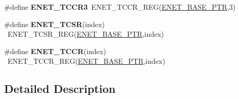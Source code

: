 \begin{DoxyCompactItemize}
\item 
\hypertarget{group___e_n_e_t___register___accessor___macros_ga71425ef7a21238436f0595fccd58d3b8}{}\#define {\bfseries E\+N\+E\+T\+\_\+\+T\+C\+C\+R3}~E\+N\+E\+T\+\_\+\+T\+C\+C\+R\+\_\+\+R\+E\+G(\hyperlink{group___e_n_e_t___peripheral_gab64a2d991cc2bd76dd55ee25a52dcb5c}{E\+N\+E\+T\+\_\+\+B\+A\+S\+E\+\_\+\+P\+T\+R},3)\label{group___e_n_e_t___register___accessor___macros_ga71425ef7a21238436f0595fccd58d3b8}

\item 
\hypertarget{group___e_n_e_t___register___accessor___macros_gac84243e82edd91a55766d2305c24369b}{}\#define {\bfseries E\+N\+E\+T\+\_\+\+T\+C\+S\+R}(index)                                              ~E\+N\+E\+T\+\_\+\+T\+C\+S\+R\+\_\+\+R\+E\+G(\hyperlink{group___e_n_e_t___peripheral_gab64a2d991cc2bd76dd55ee25a52dcb5c}{E\+N\+E\+T\+\_\+\+B\+A\+S\+E\+\_\+\+P\+T\+R},index)\label{group___e_n_e_t___register___accessor___macros_gac84243e82edd91a55766d2305c24369b}

\item 
\hypertarget{group___e_n_e_t___register___accessor___macros_ga8a02b12095976e6d53d8a9bf87353202}{}\#define {\bfseries E\+N\+E\+T\+\_\+\+T\+C\+C\+R}(index)                                              ~E\+N\+E\+T\+\_\+\+T\+C\+C\+R\+\_\+\+R\+E\+G(\hyperlink{group___e_n_e_t___peripheral_gab64a2d991cc2bd76dd55ee25a52dcb5c}{E\+N\+E\+T\+\_\+\+B\+A\+S\+E\+\_\+\+P\+T\+R},index)\label{group___e_n_e_t___register___accessor___macros_ga8a02b12095976e6d53d8a9bf87353202}

\end{DoxyCompactItemize}


\subsection{Detailed Description}
